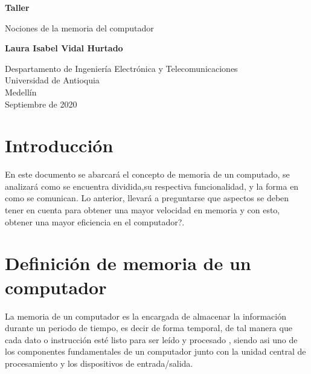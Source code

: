 \documentclass{article}
\begin{document}
\begin{titlepage}
    \begin{center}
        \vspace*{1cm}
            
        \Huge
        \textbf{Taller}
            
        \vspace{0.5cm}
        \LARGE
        Nociones de la memoria del computador
            
        \vspace{1.5cm}
            
        \textbf{Laura Isabel Vidal Hurtado}
            
        \vfill
            
        \vspace{0.8cm}
            
        \Large
        Despartamento de Ingeniería Electrónica y Telecomunicaciones\\
        Universidad de Antioquia\\
        Medellín\\
        Septiembre de 2020
            
    \end{center}
\end{titlepage}

\tableofcontents

\section{Introducción}

En este documento se abarcará el concepto de memoria de un computado, se analizará como se encuentra dividida,su respectiva funcionalidad, y la forma en como se comunican. Lo anterior, llevará a preguntarse que aspectos se deben tener en cuenta para obtener una mayor velocidad en memoria y con esto, obtener una mayor eficiencia en el computador?.


\section{Definición de memoria de un computador}

La memoria de un computador es la encargada de almacenar la información durante un periodo de tiempo, es decir de forma temporal, de tal manera que cada dato o instrucción esté listo para ser leído y procesado , siendo asi uno de los componentes fundamentales de un computador junto con la unidad central de procesamiento y los dispositivos de entrada/salida.
\end{document}
